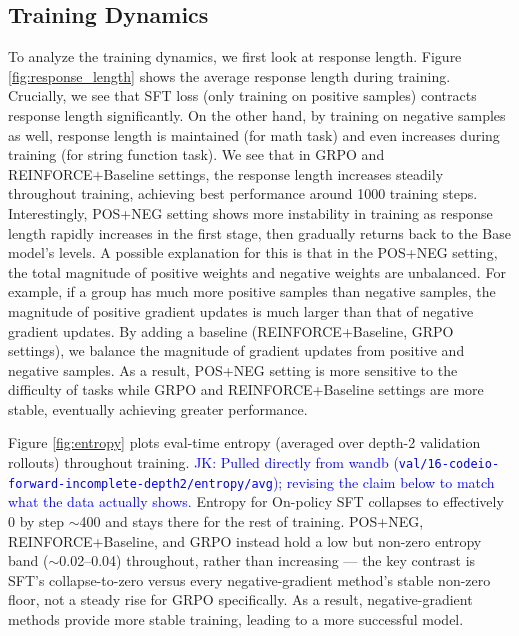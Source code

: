 \documentclass{article}
\newcommand{\el}[1]{\textcolor{purple}{EL: #1}}
\newcommand{\jk}[1]{\textcolor{blue}{JK: #1}}
\begin{document}
\subsection{Training Dynamics}


To analyze the training dynamics, we first look at response length. Figure \ref{fig:response_length} shows the average response length during training. Crucially, we see that SFT loss (only training on positive samples) contracts response length significantly. On the other hand, by training on negative samples as well, response length is maintained (for math task) and even increases during training (for string function task). 
We see that in GRPO and REINFORCE+Baseline settings, the response length increases steadily throughout training, achieving best performance around 1000 training steps. Interestingly, POS+NEG setting shows more instability in training as response length rapidly increases in the first stage, then gradually returns back to the Base model's levels. 
A possible explanation for this is that in the POS+NEG setting, the total magnitude of positive weights and negative weights are unbalanced. For example, if a group has much more positive samples than negative samples, the magnitude of positive gradient updates is much larger than that of negative gradient updates. By adding a baseline (REINFORCE+Baseline, GRPO settings), we balance the magnitude of gradient updates from positive and negative samples. As a result, POS+NEG setting is more sensitive to the difficulty of tasks while GRPO and REINFORCE+Baseline settings are more stable, eventually achieving greater performance.

Figure \ref{fig:entropy} plots eval-time entropy (averaged over depth-2 validation rollouts) throughout training. \jk{Pulled directly from wandb (\texttt{val/16-codeio-forward-incomplete-depth2/entropy/avg}); revising the claim below to match what the data actually shows.} Entropy for On-policy SFT collapses to effectively 0 by step $\sim$400 and stays there for the rest of training. POS+NEG, REINFORCE+Baseline, and GRPO instead hold a low but non-zero entropy band ($\sim$0.02--0.04) throughout, rather than increasing --- the key contrast is SFT's collapse-to-zero versus every negative-gradient method's stable non-zero floor, not a steady rise for GRPO specifically. As a result, negative-gradient methods provide more stable training, leading to a more successful model.
\end{document}

